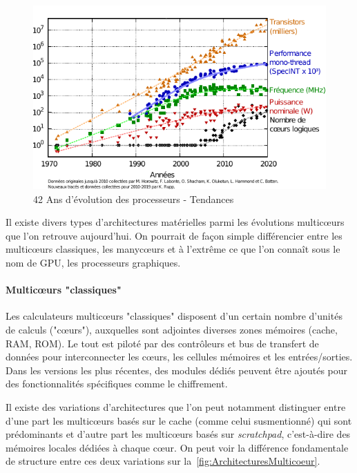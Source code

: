 \documentclass[french, a4paper, 11pt, twoside, pdftex]{StyleThese}
\begin{document}
		\begin{figure}[h!]
			\centering
			\includegraphics[width=0.8\linewidth]{graphiques/processors_trend}
			\caption[Évolution des processeurs]{42 Ans d'évolution des processeurs - Tendances}
			\label{fig:processorstrend}
		\end{figure}
		
		Il existe divers types d'architectures matérielles parmi les évolutions multicœurs que l'on retrouve aujourd'hui. On pourrait de façon simple différencier entre les multicœurs classiques, les manycœurs et à l'extrême ce que l'on connaît sous le nom de GPU, les processeurs graphiques.
		
		\paragraph{Multicœurs "classiques"} \label{Intro:multicoeurs}
		Les calculateurs multicœurs "classiques" disposent d'un certain nombre d'unités de calculs ("cœurs"), auxquelles sont adjointes diverses zones mémoires (cache, RAM, ROM). Le tout est piloté par des contrôleurs et bus de transfert de données pour interconnecter les cœurs, les cellules mémoires et les entrées/sorties. Dans les versions les plus récentes, des modules dédiés peuvent être ajoutés pour des fonctionnalités spécifiques comme le chiffrement.
			
		Il existe des variations d'architectures que l'on peut notamment distinguer entre d'une part les multicœurs basés sur le cache (comme celui susmentionné) qui sont prédominants et d'autre part les multicœurs basés sur \emph{scratchpad}, c'est-à-dire des mémoires locales dédiées à chaque cœur. On peut voir la différence fondamentale de structure entre ces deux variations sur la~\autoref{fig:ArchitecturesMulticoeur}.			
			
\end{document}
